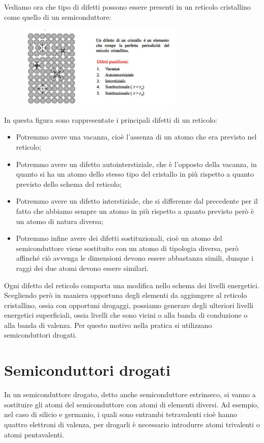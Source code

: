 \vspace{0.2cm}Vediamo ora che tipo di difetti possono essere presenti in un reticolo cristallino come quello di un semiconduttore:
\begin{figure}[H]
   \centering
   \includegraphics[width=0.7\textwidth]{immagini/difetti_cristallini.png}
\end{figure}
In questa figura sono rappresentate i principali difetti di un reticolo:
\begin{itemize}[leftmargin=0.5cm]
   \item Potremmo avere una vacanza, cioè l'assenza di un atomo che era previsto nel reticolo;
   \item Potremmo avere un difetto autointerstiziale, che è l'opposto della vacanza, in quanto si ha un atomo dello stesso tipo del cristallo in più rispetto a quanto previsto dello schema del reticolo;
   \item Potremmo avere un difetto interstiziale, che si differenze dal precedente per il fatto che abbiamo sempre un atomo in più rispetto a quanto previsto però è un atomo di natura diversa;
   \item Potremmo infine avere dei difetti sostituzionali, cioè un atomo del semiconduttore viene sostituito con un atomo di tipologia diversa, però affinché ciò avvenga le dimensioni devono essere abbastanza simili, dunque i raggi dei due atomi devono essere similari.
\end{itemize}
Ogni difetto del reticolo comporta una modifica nello schema dei livelli energetici. Scegliendo però in maniera opportuna degli elementi da aggiungere al reticolo cristallino, ossia con opportuni drogaggi, possiamo generare degli ulteriori livelli energetici superficiali, ossia livelli che sono vicini o alla banda di conduzione o alla banda di valenza. Per questo motivo nella pratica si utilizzano semiconduttori drogati.

\section{Semiconduttori drogati}
In un semiconduttore drogato, detto anche semiconduttore estrinseco, si vanno a sostituire gli atomi del semiconduttore con atomi di elementi diversi. Ad esempio, nel caso di silicio e germanio, i quali sono entrambi tetravalenti cioè hanno quattro elettroni di valenza, per drogarli è necessario introdurre atomi trivalenti o atomi pentavalenti.

